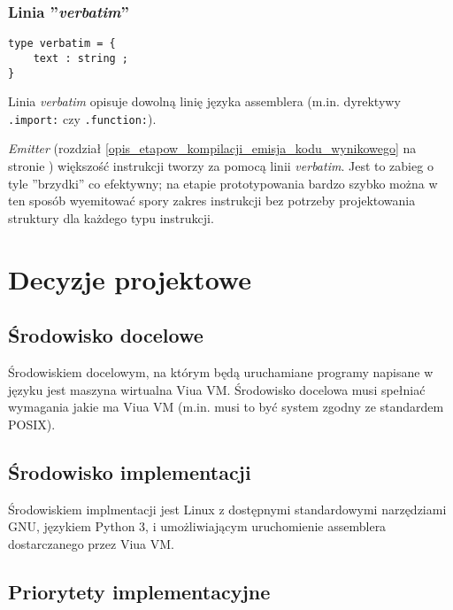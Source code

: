 \subsubsection{Linia ''\emph{verbatim}''}
\label{diagram_klas_linia_verbatim}

\begin{small}
\begin{lstlisting}
type verbatim = {
    text : string ;
}
\end{lstlisting}
\end{small}

Linia \emph{verbatim} opisuje dowolną linię języka assemblera (m.in. dyrektywy \texttt{.import:} czy
\texttt{.function:}).

\emph{Emitter} (rozdział \ref{opis_etapow_kompilacji_emisja_kodu_wynikowego} na stronie
\pageref{opis_etapow_kompilacji_emisja_kodu_wynikowego}) większość instrukcji tworzy za pomocą linii
\emph{verbatim}. Jest to zabieg o tyle ''brzydki'' co efektywny; na etapie prototypowania bardzo szybko
można w ten sposób wyemitować spory zakres instrukcji bez potrzeby projektowania struktury dla każdego typu
instrukcji.

\section{Decyzje projektowe}

\subsection{Środowisko docelowe}

Środowiskiem docelowym, na którym będą uruchamiane programy napisane w języku \ViuAct jest maszyna wirtualna
Viua VM. Środowisko docelowa musi spełniać wymagania jakie ma Viua VM (m.in. musi to być system zgodny ze
standardem POSIX).

\subsection{Środowisko implementacji}

Środowiskiem implmentacji jest Linux z dostępnymi standardowymi narzędziami GNU, językiem Python 3, i
umożliwiającym uruchomienie assemblera dostarczanego przez Viua VM.

\subsection{Priorytety implementacyjne}

